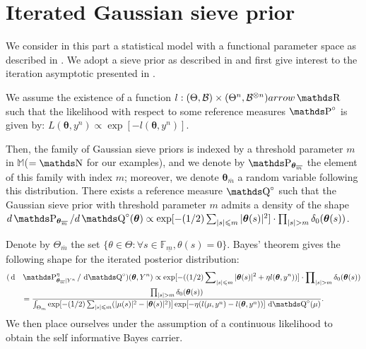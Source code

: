 \section{Iterated Gaussian sieve prior}\label{BAYES_SIEVE}

We consider in this part a statistical model with a functional parameter space as described in .
We adopt a sieve prior as described in  and first give interest to the iteration asymptotic presented in .

We assume the existence of a function $l: (\Theta, \mathcal{B}) \times (\Theta^{n}, \mathcal{B}^{\otimes n}) arrow \R$ such that the likelihood with respect to some reference measures $\P^{\circ}$ is given by: $L(\boldsymbol{\theta}, y^{n}) \propto \exp[-l(\boldsymbol{\theta}, y^{n})]$.

Then, the family of Gaussian sieve priors is indexed by a threshold parameter $m$ in $\mathds{M}$($= \N$ for our examples), and we denote by $\P_{\boldsymbol{\theta}_{\overline{m}}}$ the element of this family with index $m$; moreover, we denote $\boldsymbol{\theta}_{\overline{m}}$ a random variable following this distribution. 
There exists a reference measure $\Q^{\circ}$ such that the Gaussian sieve prior with threshold parameter $m$ admits a density of the shape
$d\P_{\boldsymbol{\theta}_{\overline{m}}}/d\Q^{\circ}(\boldsymbol{\theta}) \propto \exp[-(1/2)\sum_{\vert s \vert \leq m} \vert \boldsymbol{\theta}(s) \vert^{2} ] \cdot \prod_{\vert s \vert > m} \delta_{0}(\boldsymbol{\theta}(s))$.

Denote by $\Theta_{\overline{m}}$ the set $\{\theta \in \Theta : \forall s \in \mathds{F}_{\underline{m}}, \theta(s) = 0\}$.
Bayes' theorem gives the following shape for the iterated posterior distribution:
\begin{alignat*}{2}
& (\d&&\P_{\boldsymbol{\theta}_{\overline{m}}\vert Y^{n}}^{\eta}/\d\Q^{\circ})(\boldsymbol{\theta}, Y^{n}) \propto \exp[-((1/2)\sum\nolimits_{\vert s \vert \leq m} \vert \boldsymbol{\theta}(s) \vert^{2} + \eta l(\boldsymbol{\theta}, y^{n}))] \cdot \prod\nolimits_{\vert s \vert > m} \delta_{0}(\boldsymbol{\theta}(s))\\
& && = \frac{\prod_{\vert s \vert > m} \delta_{0}(\boldsymbol{\theta}(s))}{\int_{\Theta_{m}} \exp[-(1/2)\sum_{\vert s \vert \leq m} (\vert \mu(s) \vert^{2} - \vert \boldsymbol{\theta}(s) \vert^{2})]\exp[-\eta(l(\mu, y^{n}) - l(\boldsymbol{\theta}, y^{n}))] \d\Q^{\circ}(\mu)}.
\end{alignat*}
We then place ourselves under the assumption of a continuous likelihood to obtain the self informative Bayes carrier.

